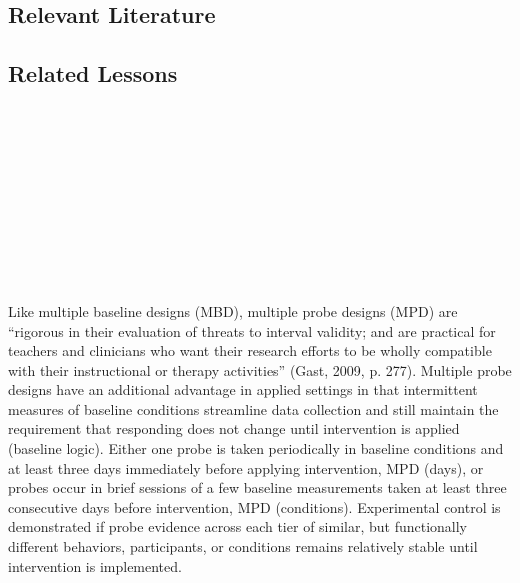 \subsection{Relevant Literature}
\begin{refsection}
\nocite{cooper2007applied,
  barger2004multiple,
  carr2005recommendations,
  harris1985comparisons,
  harvey2004nonconcurrent,
  watson1981non,
  zhan2001single}
\printbibliography[heading=none]
\end{refsection}
%
\subsection{Related Lessons}
\fourbThree{}\\
\fourbFour{}\\
\fourbEight{}\\
\fourbNine{}\\
\fourbTen{}\\
\fourbEleven{}\\
\foureOne{}\\
\fourhThree{}\\
\fouriFive{}\\
\fourFKThirtyThree{}\\
%
Like multiple baseline designs (MBD), multiple probe designs (MPD) are ``rigorous in their evaluation of threats to interval validity; and are practical for teachers and clinicians who want their research efforts to be wholly compatible with their instructional or therapy activities'' (Gast, 2009, p. 277). Multiple probe designs have an additional advantage in applied settings in that intermittent measures of baseline conditions streamline data collection and still maintain the requirement that responding does not change until intervention is applied (baseline logic). Either one probe is taken periodically in baseline conditions and at least three days immediately before applying intervention, MPD (days), or probes occur in brief sessions of a few baseline measurements taken at least three consecutive days before intervention, MPD (conditions). Experimental control is demonstrated if probe evidence across each tier of similar, but functionally different behaviors, participants, or conditions remains relatively stable until intervention is implemented. 
%
